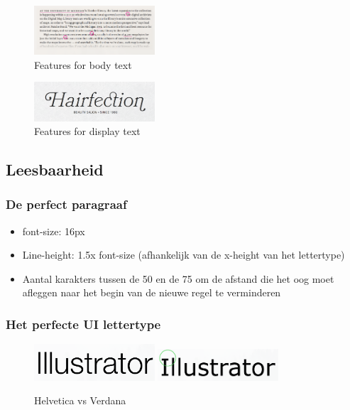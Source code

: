 \documentclass{article}
\begin{document}
\begin{figure}[H]
    \centering
    \includegraphics[width=0.4\textwidth]{img/Screenshot_20200224_095650.png}
    \caption{Features for body text}
\end{figure}

\begin{figure}[H]
    \centering
    \includegraphics[width=0.4\textwidth]{img/Screenshot_20200224_095756.png}
    \caption{Features for display text}
\end{figure}

\subsection{Leesbaarheid}
\subsubsection{De perfect paragraaf}
\begin{itemize}
    \item font-size: 16px
    \item Line-height: 1.5x font-size (afhankelijk van de x-height van het lettertype)
    \item Aantal karakters tussen de 50 en de 75 om de afstand die het oog moet afleggen naar het begin van de nieuwe regel te verminderen
\end{itemize}



\subsubsection{Het perfecte UI lettertype}
\begin{figure}[H]
    \centering
    \includegraphics[width=0.4\textwidth]{img/Screenshot_20200224_100023.png}
    \includegraphics[width=0.4\textwidth]{img/Screenshot_20200224_100030.png}
    \caption{Helvetica vs Verdana}
\end{figure}
\end{document}
